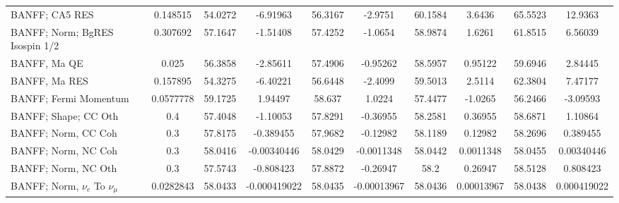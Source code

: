 \begin{tabular}{| l | S | S  S | S  S | S  S | S  S | }
                                                                  BANFF; CA5 RES &        0.148515 &         54.0272 &        -6.91963 &         56.3167 &         -2.9751 &         60.1584 &          3.6436 &         65.5523 &         12.9363 \\ 
                                                  BANFF; Norm; BgRES Isospin 1/2 &        0.307692 &         57.1647 &        -1.51408 &         57.4252 &         -1.0654 &         58.9874 &          1.6261 &         61.8515 &         6.56039 \\ 
                                                                    BANFF, Ma QE &           0.025 &         56.3858 &        -2.85611 &         57.4906 &        -0.95262 &         58.5957 &         0.95122 &         59.6946 &         2.84445 \\ 
                                                                   BANFF, Ma RES &        0.157895 &         54.3275 &        -6.40221 &         56.6448 &         -2.4099 &         59.5013 &          2.5114 &         62.3804 &         7.47177 \\ 
                                                           BANFF; Fermi Momentum &       0.0577778 &         59.1725 &         1.94497 &          58.637 &          1.0224 &         57.4477 &         -1.0265 &         56.2466 &        -3.09593 \\ 
                                                            BANFF; Shape; CC Oth &             0.4 &         57.4048 &        -1.10053 &         57.8291 &        -0.36955 &         58.2581 &         0.36955 &         58.6871 &         1.10864 \\ 
                                                             BANFF; Norm, CC Coh &             0.3 &         57.8175 &       -0.389455 &         57.9682 &        -0.12982 &         58.1189 &         0.12982 &         58.2696 &        0.389455 \\ 
                                                             BANFF; Norm, NC Coh &             0.3 &         58.0416 &     -0.00340446 &         58.0429 &      -0.0011348 &         58.0442 &       0.0011348 &         58.0455 &      0.00340446 \\ 
                                                             BANFF; Norm, NC Oth &             0.3 &         57.5743 &       -0.808423 &         57.8872 &        -0.26947 &            58.2 &         0.26947 &         58.5128 &        0.808423 \\ 
                                           BANFF; Norm, $\nu_{e}$ To $\nu_{\mu}$ &       0.0282843 &         58.0433 &    -0.000419022 &         58.0435 &     -0.00013967 &         58.0436 &      0.00013967 &         58.0438 &     0.000419022 \\ 

\end{tabular}
